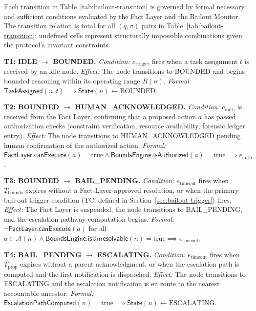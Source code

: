 Each transition in Table~\ref{tab:bailout-transition} is governed by formal necessary and sufficient conditions evaluated by the Fact Layer and the Bailout Monitor. The transition relation is total for all $(q, \sigma)$ pairs in Table~\ref{tab:bailout-transition}; undefined cells represent structurally impossible combinations given the protocol's invariant constraints.

\bigskip
\noindent\textbf{T1: IDLE $\rightarrow$ BOUNDED.} \emph{Condition:} $e_{\text{trigger}}$ fires when a task assignment $t$ is received by an idle node. \emph{Effect:} The node transitions to BOUNDED and begins bounded reasoning within its operating range $R(n)$. \emph{Formal:} $\mathsf{TaskAssigned}(n, t) \implies \mathsf{State}(n) \leftarrow \text{BOUNDED}$.

\bigskip
\noindent\textbf{T2: BOUNDED $\rightarrow$ HUMAN\_ACKNOWLEDGED.} \emph{Condition:} $e_{\text{auth}}$ is received from the Fact Layer, confirming that a proposed action $a$ has passed authorization checks (constraint verification, resource availability, forensic ledger entry). \emph{Effect:} The node transitions to HUMAN\_ACKNOWLEDGED pending human confirmation of the authorized action. \emph{Formal:} $\mathsf{FactLayer.canExecute}(a) = \text{true} \land \mathsf{BoundsEngine.isAuthorized}(a) = \text{true} \implies e_{\text{auth}}$.

\bigskip
\noindent\textbf{T3: BOUNDED $\rightarrow$ BAIL\_PENDING.} \emph{Condition:} $e_{\text{timeout}}$ fires when $T_{\text{bounds}}$ expires without a Fact-Layer-approved resolution, or when the primary bail-out trigger condition (TC, defined in Section~\ref{sec:bailout-trigger}) fires. \emph{Effect:} The Fact Layer is suspended, the node transitions to BAIL\_PENDING, and the escalation pathway computation begins. \emph{Formal:} $\neg\mathsf{FactLayer.canExecute}(a)$ for all $a \in \mathcal{A}(n) \land \mathsf{BoundsEngine.isUnresolvable}(n) = \text{true} \implies e_{\text{timeout}}$.

\bigskip
\noindent\textbf{T4: BAIL\_PENDING $\rightarrow$ ESCALATING.} \emph{Condition:} $e_{\text{timeout}}$ fires when $T_{\text{prop}}$ expires without a parent acknowledgment, or when the escalation path is computed and the first notification is dispatched. \emph{Effect:} The node transitions to ESCALATING and the escalation notification is en route to the nearest accountable ancestor. \emph{Formal:} $\mathsf{EscalationPathComputed}(n) = \text{true} \implies \mathsf{State}(n) \leftarrow \text{ESCALATING}$.

